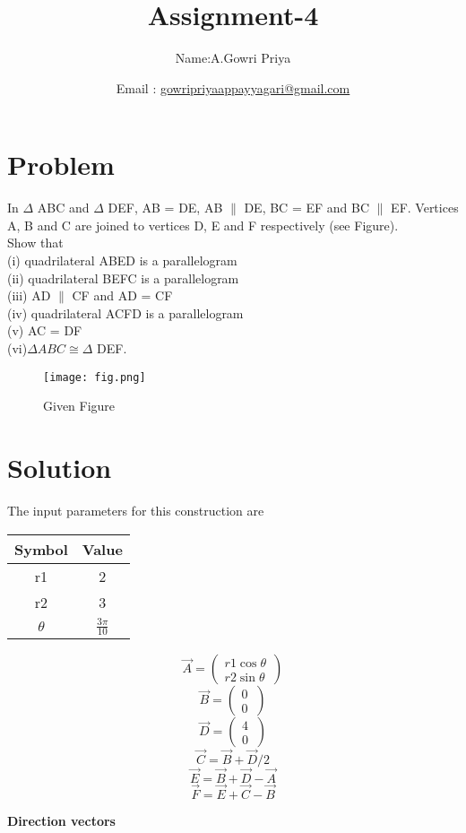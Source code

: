 \documentclass[10pt, a4paper]{article}
\begin{document}
\title{Assignment-4}
\author{Name:A.Gowri Priya\and Email :  \url{gowripriyaappayyagari@gmail.com}}
\date{}
\maketitle


  \section{Problem}
In  $\Delta$  ABC and  $\Delta$ DEF, AB = DE, AB $\parallel$ DE, BC = EF
and BC $\parallel$ EF. Vertices A, B and C are joined to
vertices D, E and F respectively (see Figure).\\
Show that\\
(i) quadrilateral ABED is a parallelogram\\
(ii) quadrilateral BEFC is a parallelogram\\
(iii) AD $\parallel$ CF and AD = CF\\
(iv) quadrilateral ACFD is a parallelogram\\
(v) AC = DF\\
(vi)$\Delta ABC \cong \Delta$  DEF.\\
\begin{figure}[h]
\centering
\texttt{[image: fig.png]} 
\caption{Given Figure}
\end{figure}

\section{Solution}
\begin{center}
The input parameters for this construction are
\begin{tabular}{|c|c|}
	\hline
	\textbf{Symbol}&\textbf{Value}\\
	\hline
	r1&2\\
	\hline
	r2&3\\
	\hline
	$\theta$&$\frac{{3}\pi}{10}$\\
	\hline
\end{tabular}
\boldmath
$$\vec{A}=\begin{pmatrix} r1\cos\theta\\ r2\sin\theta\ \end{pmatrix}$$
$$\vec{B}=\begin{pmatrix} 0\\ 0\ \end{pmatrix}$$
$$\vec{D}=\begin{pmatrix} 4\\ 0\ \end{pmatrix}$$
$$\vec{C}={\vec{B}+\vec{D}}/2$$
$$\vec{E}={\vec{B}+\vec{D}-\vec{A}}$$
$$\vec{F}={\vec{E}+\vec{C}-\vec{B}}$$
\unboldmath
\end{center}
\textbf{Direction vectors}
\end{document}
